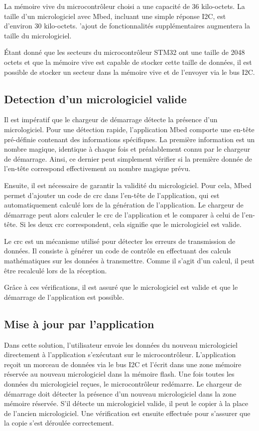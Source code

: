 La mémoire vive du microcontrôleur choisi a une capacité de 36 kilo-octets.
La taille d'un micrologiciel avec Mbed, incluant une simple réponse I2C, est d'environ 30 kilo-octets.
'ajout de fonctionnalités supplémentaires augmentera la taille du micrologiciel.

Étant donné que les secteurs du microcontrôleur STM32 ont une taille de 2048 octets et que la mémoire vive est capable de stocker cette taille de données, il est possible de stocker un secteur dans la mémoire vive et de l'envoyer via le bus I2C.

\subsection{Detection d'un micrologiciel valide}

Il est impératif que le chargeur de démarrage détecte la présence d'un micrologiciel.
Pour une détection rapide, l'application Mbed comporte une en-tête pré-définie contenant des informations spécifiques.
La première information est un nombre magique, identique à chaque fois et préalablement connu par le chargeur de démarrage.
Ainsi, ce dernier peut simplement vérifier si la première donnée de l'en-tête correspond effectivement au nombre magique prévu.

Ensuite, il est nécessaire de garantir la validité du micrologiciel.
Pour cela, Mbed permet d'ajouter un code de \gls{crc} dans l'en-tête de l'application, qui est automatiquement calculé lors de la génération de l'application.
Le chargeur de démarrage peut alors calculer le \gls{crc} de l'application et le comparer à celui de l'en-tête.
Si les deux \gls{crc} correspondent, cela signifie que le micrologiciel est valide.

Le \gls{crc} est un mécanisme utilisé pour détecter les erreurs de transmission de données.
Il consiste à générer un code de contrôle en effectuant des calculs mathématiques sur les données à transmettre.
Comme il s'agit d'un calcul, il peut être recalculé lors de la réception.

Grâce à ces vérifications, il est assuré que le micrologiciel est valide et que le démarrage de l'application est possible.

\subsection{Mise à jour par l'application}

Dans cette solution, l'utilisateur envoie les données du nouveau micrologiciel directement à l'application s'exécutant sur le microcontrôleur.
L'application reçoit un morceau de données via le bus I2C et l'écrit dans une zone mémoire réservée au nouveau micrologiciel dans la mémoire flash.
Une fois toutes les données du micrologiciel reçues, le microcontrôleur redémarre.
Le chargeur de démarrage doit détecter la présence d'un nouveau micrologiciel dans la zone mémoire réservée.
S'il détecte un micrologiciel valide, il peut le copier à la place de l'ancien micrologiciel.
Une vérification est ensuite effectuée pour s'assurer que la copie s'est déroulée correctement.

